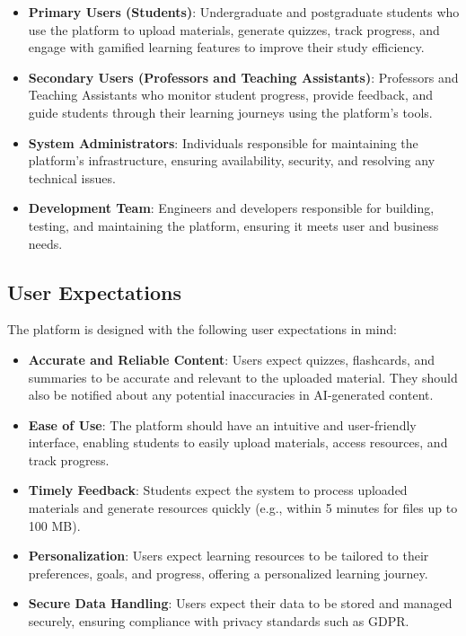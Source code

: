 \documentclass[12pt]{article}
\begin{document}
\begin{itemize}
    \item \textbf{Primary Users (Students)}:  
    Undergraduate and postgraduate students who use the platform to upload materials, generate quizzes, track progress, and engage with gamified learning features to improve their study efficiency.

    \item \textbf{Secondary Users (Professors and Teaching Assistants)}:  
    Professors and Teaching Assistants who monitor student progress, provide feedback, and guide students through their learning journeys using the platform’s tools.

    \item \textbf{System Administrators}:  
    Individuals responsible for maintaining the platform’s infrastructure, ensuring availability, security, and resolving any technical issues.

    \item \textbf{Development Team}:  
    Engineers and developers responsible for building, testing, and maintaining the platform, ensuring it meets user and business needs.
\end{itemize}




\subsection{User Expectations}
The platform is designed with the following user expectations in mind:
\begin{itemize}
    \item \textbf{Accurate and Reliable Content}: Users expect quizzes, flashcards, and summaries to be accurate and relevant to the uploaded material. They should also be notified about any potential inaccuracies in AI-generated content.
    \item \textbf{Ease of Use}: The platform should have an intuitive and user-friendly interface, enabling students to easily upload materials, access resources, and track progress.
    \item \textbf{Timely Feedback}: Students expect the system to process uploaded materials and generate resources quickly (e.g., within 5 minutes for files up to 100 MB).
    \item \textbf{Personalization}: Users expect learning resources to be tailored to their preferences, goals, and progress, offering a personalized learning journey.
    \item \textbf{Secure Data Handling}: Users expect their data to be stored and managed securely, ensuring compliance with privacy standards such as GDPR.
\end{itemize}
\end{document}
